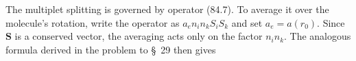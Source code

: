 \SolutionHeading The multiplet splitting is governed by operator (84.7). To average it over the molecule's rotation, write the operator as $a_en_in_kS_iS_k$ and set $a_e=a(r_0)$. Since $\mathbf S$ is a conserved vector, the averaging acts only on the factor $n_in_k$. The analogous formula derived in the problem to \S~29 then gives
